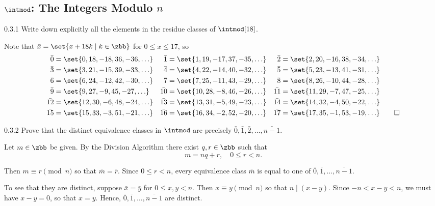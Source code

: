\subsection{\texorpdfstring{$\intmod$: The Integers Modulo $n$}{Z/nZ: The Integers Modulo n}}

\begin{exercise}{0.3.1}
    Write down explicitly all the elements in the residue classes of $\intmod[18]$.
\end{exercise}

\begin{sol}
    Note that $\bar x = \set{x + 18k \mid k \in \zbb}$ for $0 \leq x \leq 17$, so
    \begin{align*}
        \bar 0 & = \set{0, 18, -18, 36, -36, \ldots} & \bar 1 & = \set{1, 19, -17, 37, -35, \ldots} & \bar 2 & = \set{2, 20, -16, 38, -34, \ldots} \\
        \bar 3 & = \set{3, 21, -15, 39, -33, \ldots} & \bar 4 & = \set{4, 22, -14, 40, -32, \ldots} & \bar 5 & = \set{5, 23, -13, 41, -31, \ldots} \\
        \bar 6 & = \set{6, 24, -12, 42, -30, \ldots} & \bar 7 & = \set{7, 25, -11, 43, -29, \ldots} & \bar 8 & = \set{8, 26, -10, 44, -28, \ldots} \\
        \bar 9 & = \set{9, 27, -9, 45, -27, \ldots} & \bar{10} & = \set{10, 28, -8, 46, -26, \ldots} & \bar{11} & = \set{11, 29, -7, 47, -25, \ldots} \\
        \bar{12} & = \set{12, 30, -6, 48, -24, \ldots} & \bar{13} & = \set{13, 31, -5, 49, -23, \ldots} & \bar{14} & = \set{14, 32, -4, 50, -22, \ldots} \\
        \bar{15} & = \set{15, 33, -3, 51, -21, \ldots} & \bar{16} & = \set{16, 34, -2, 52, -20, \ldots} & \bar{17} & = \set{17, 35, -1, 53, -19, \ldots} \qedhere
    \end{align*}
\end{sol}

\begin{exercise}{0.3.2}
    Prove that the distinct equivalence classes in $\intmod$ are precisely $\bar 0, \bar 1, \bar 2, \ldots, \bar{n - 1}$.
\end{exercise}

\begin{sol}
    Let $m \in \zbb$ be given.
    By the Division Algorithm there exist $q, r \in \zbb$ such that
    \[
        m = nq + r, \quad 0 \leq r < n.
    \]

    Then $m \equiv r \pmod n$ so that $\bar m = \bar r$. Since $0 \leq r < n$, every equivalence class $\bar m$ is equal to one of $\bar 0, \bar 1, \ldots, \bar{n - 1}$.
    
    To see that they are distinct, suppose $\bar x = \bar y$ for $0 \leq x, y < n$.
    Then $x \equiv y \pmod n$ so that $n \mid (x - y)$.
    Since $-n < x - y < n$, we must have $x - y = 0$, so that $x = y$.
    Hence, $\bar 0, \bar 1, \ldots, \bar{n - 1}$ are distinct.
\end{sol}

